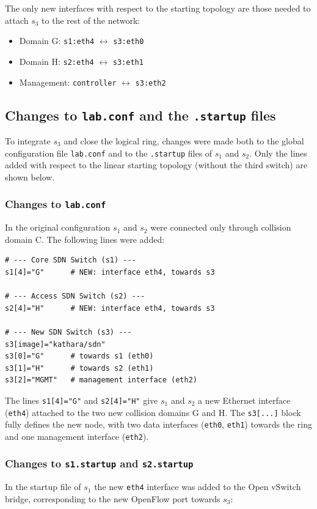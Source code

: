 \documentclass[11pt,a4paper]{article}
\newcommand{\code}[1]{\texttt{#1}}
\begin{document}
The only new interfaces with respect to the starting topology are those needed
to attach $s_3$ to the rest of the network:
\begin{itemize}
  \item Domain G: \code{s1:eth4} $\leftrightarrow$ \code{s3:eth0}
  \item Domain H: \code{s2:eth4} $\leftrightarrow$ \code{s3:eth1}
  \item Management: \code{controller} $\leftrightarrow$ \code{s3:eth2}
\end{itemize}

\subsection{Changes to \texttt{lab.conf} and the \texttt{.startup} files}
To integrate $s_3$ and close the logical ring, changes were made both to the
global configuration file \code{lab.conf} and to the \code{.startup} files of
$s_1$ and $s_2$. Only the lines added with respect to the linear starting
topology (without the third switch) are shown below.

\subsubsection{Changes to \texttt{lab.conf}}
In the original configuration $s_1$ and $s_2$ were connected only through
collision domain C. The following lines were added:

\begin{lstlisting}[style=sh,caption={Lines added to \texttt{lab.conf} to insert $s_3$}]
# --- Core SDN Switch (s1) ---
s1[4]="G"      # NEW: interface eth4, towards s3

# --- Access SDN Switch (s2) ---
s2[4]="H"      # NEW: interface eth4, towards s3

# --- New SDN Switch (s3) ---
s3[image]="kathara/sdn"
s3[0]="G"      # towards s1 (eth0)
s3[1]="H"      # towards s2 (eth1)
s3[2]="MGMT"   # management interface (eth2)
\end{lstlisting}

The lines \code{s1[4]="G"} and \code{s2[4]="H"} give $s_1$ and $s_2$ a new
Ethernet interface (\code{eth4}) attached to the two new collision domains G and
H. The \code{s3[...]} block fully defines the new node, with two data interfaces
(\code{eth0}, \code{eth1}) towards the ring and one management interface
(\code{eth2}).

\subsubsection{Changes to \texttt{s1.startup} and \texttt{s2.startup}}
In the startup file of $s_1$ the new \code{eth4} interface was added to the
Open vSwitch bridge, corresponding to the new OpenFlow port towards $s_3$:
\end{document}
